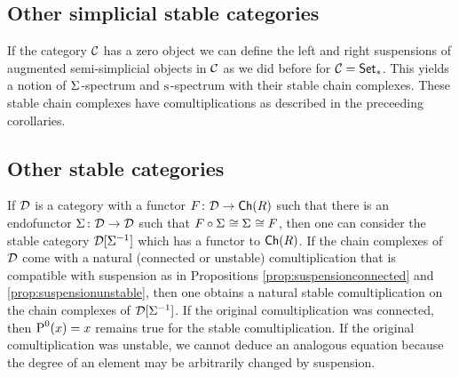 \subsection{Other simplicial stable categories}
If the category $\mathcal{C}$ has a zero object we can define the left and right suspensions of augmented semi-simplicial objects in $\mathcal{C}$ as we did before for $\mathcal{C} = \mathsf{Set}_*$. This yields a notion of $\Sigma^{}$-spectrum and $\operatorname{s}^{}$-spectrum with their stable chain complexes. These stable chain complexes have comultiplications as described in the preceeding corollaries. 

\subsection{Other stable categories}
If $\mathcal{D}$ is a category with a functor $F\colon \mathcal{D}\to \mathsf{Ch}(R)$ such that there is an endofunctor $\Sigma^{}\colon \mathcal{D}\to \mathcal{D}$ such that $F\circ \Sigma^{} \cong \Sigma^{}\cong F$, then one can consider the stable category $\mathcal{D}[\Sigma^{-1}]$ which has a functor to $\mathsf{Ch}(R)$. If the chain complexes of $\mathcal{D}$ come with a natural (connected or unstable) comultiplication that is compatible with suspension as in Propositions \ref{prop:suspensionconnected} and \ref{prop:suspensionunstable}, then one obtains a natural stable comultiplication on the chain complexes of $\mathcal{D}[\Sigma^{-1}]$. If the original comultiplication was connected, then $\operatorname{P}^0(x) = x$ remains true for the stable comultiplication. If the original comultiplication was unstable, we cannot deduce an analogous equation because the degree of an element may be arbitrarily changed by suspension.  
